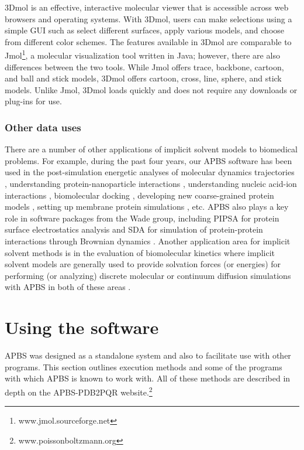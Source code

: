 \documentclass[journal=jpcbfk, manuscript=article]{achemso}
\begin{document}
3Dmol is an effective, interactive molecular viewer that is accessible across web browsers and operating systems. With 3Dmol, users can make selections using a simple GUI such as select different surfaces, apply various models, and choose from different color schemes.  The features available in 3Dmol are comparable to Jmol\footnote{www.jmol.sourceforge.net}, a molecular visualization tool written in Java; however, there are also differences between the two tools. While Jmol offers trace, backbone, cartoon, and ball and stick models, 3Dmol offers cartoon, cross, line, sphere, and stick models. Unlike Jmol, 3Dmol loads quickly and does not require any downloads or plug-ins for use. 

\subsubsection{Other data uses}
There are a number of other applications of implicit solvent models to biomedical problems. For example, during the past four years, our APBS software has been used in the post-simulation energetic analyses of molecular dynamics trajectories \cite{dror2013}, understanding protein-nanoparticle interactions \cite{treuel2013, nienhaus2013, depaoli2014}, understanding nucleic acid-ion interactions \cite{lipfert2014, giambasu2014}, biomolecular docking \cite{roberts2013}, developing new coarse-grained protein models \cite{spiga2013}, setting up membrane protein simulations \cite{stansfeld2015}, etc. APBS also plays a key role in software packages from the Wade group, including PIPSA for protein surface electrostatics analysis \cite{richter2008} and SDA for simulation of protein-protein interactions through Brownian dynamics \cite{martinez2015}. Another application area for implicit solvent methods is in the evaluation of biomolecular kinetics where implicit solvent models are generally used to provide solvation forces (or energies) for performing (or analyzing) discrete molecular or continuum diffusion simulations with APBS in both of these areas \cite{dror2013, martinez2015, chen2007, song2004a, song2004b, elcock2004, mereghetti2012}.

\section{Using the software}
APBS was designed as a standalone system and also to facilitate use with other programs. This section outlines execution methods and some of the programs with which APBS is known to work with. All of these methods are described in depth on the APBS-PDB2PQR website.\footnote{www.poissonboltzmann.org}
\end{document}
